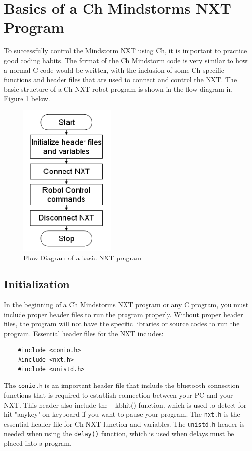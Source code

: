 \section{Basics of a Ch Mindstorms NXT Program}
To successfully control the Mindstorm NXT using Ch, it is 
important to practice good coding habits. The format of the Ch 
Mindstorm code is very similar to how a normal C code would be 
written, with the inclusion of some Ch specific functions and 
header files that are used to connect and control the NXT. The 
basic structure of a Ch NXT robot program is shown in the flow 
diagram in Figure \ref{fig_NXT_pstruc} below.\\

\begin{figure}[h!]
  \begin{center}
    \includegraphics[height=3in]{figure/mindstorm/NXT_pstruc.png}
    \caption{Flow Diagram of a basic NXT program\label{fig_NXT_pstruc}}
  \end{center}
\end{figure}

\subsection{Initialization}
In the beginning of a Ch Mindstorms NXT program or any C program,
you must include proper header files to run the program properly.
Without proper header files, the program will not have the 
specific libraries or source codes to run the program. Essential 
header files for the NXT includes:
\begin{verbatim}
    #include <conio.h>
    #include <nxt.h>
    #include <unistd.h>
\end{verbatim}
\noindent
The \verb+conio.h+ is an important header file that include the 
bluetooth connection functions that is required to establish 
connection between your PC and your NXT. This header also include
the \_kbhit() function, which is used to detect for hit "anykey" 
on keyboard if you want to pause your program. The \verb+nxt.h+ 
is the essential header file for Ch NXT function and variables.  
The \verb+unistd.h+ header is needed when using the 
\verb+delay()+ function, which is used when delays must be placed
into a program.

